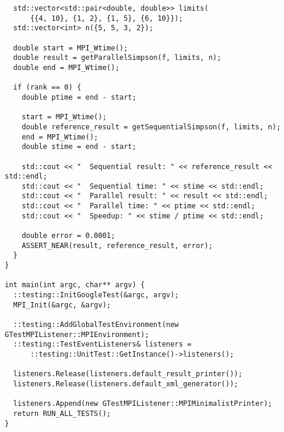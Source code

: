 \documentclass{report}
\begin{document}
\begin{lstlisting}
  std::vector<std::pair<double, double>> limits(
      {{4, 10}, {1, 2}, {1, 5}, {6, 10}});
  std::vector<int> n({5, 5, 3, 2});

  double start = MPI_Wtime();
  double result = getParallelSimpson(f, limits, n);
  double end = MPI_Wtime();

  if (rank == 0) {
    double ptime = end - start;

    start = MPI_Wtime();
    double reference_result = getSequentialSimpson(f, limits, n);
    end = MPI_Wtime();
    double stime = end - start;

    std::cout << "  Sequential result: " << reference_result << std::endl;
    std::cout << "  Sequential time: " << stime << std::endl;
    std::cout << "  Parallel result: " << result << std::endl;
    std::cout << "  Parallel time: " << ptime << std::endl;
    std::cout << "  Speedup: " << stime / ptime << std::endl;

    double error = 0.0001;
    ASSERT_NEAR(result, reference_result, error);
  }
}

int main(int argc, char** argv) {
  ::testing::InitGoogleTest(&argc, argv);
  MPI_Init(&argc, &argv);

  ::testing::AddGlobalTestEnvironment(new GTestMPIListener::MPIEnvironment);
  ::testing::TestEventListeners& listeners =
      ::testing::UnitTest::GetInstance()->listeners();

  listeners.Release(listeners.default_result_printer());
  listeners.Release(listeners.default_xml_generator());

  listeners.Append(new GTestMPIListener::MPIMinimalistPrinter);
  return RUN_ALL_TESTS();
}
\end{lstlisting}
\end{document}
